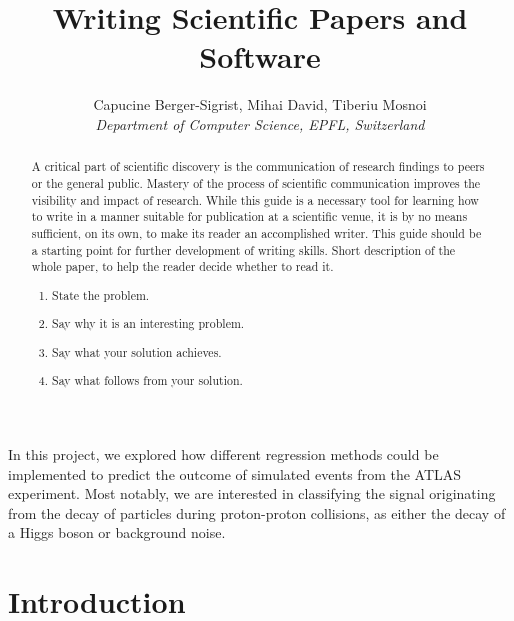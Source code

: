 \documentclass[10pt,conference,compsocconf]{IEEEtran}
\begin{document}
\title{Writing Scientific Papers and Software}

\author{
  Capucine Berger-Sigrist, Mihai David, Tiberiu Mosnoi\\
  \textit{Department of Computer Science, EPFL, Switzerland}
}

\maketitle
\begin{abstract}
A critical part of scientific discovery is the
communication of research findings to peers or the general public.
Mastery of the process of scientific communication improves the
visibility and impact of research. While this guide is a necessary
tool for learning how to write in a manner suitable for publication
at a scientific venue, it is by no means sufficient, on its own, to
make its reader an accomplished writer. 
This guide should be a starting point for further development of 
writing skills.
Short description of the whole paper, to help the
reader decide whether to read it. ~\cite{higgsMLdoc}
\begin{enumerate}
    \item State the problem.
    \item Say why it is an interesting problem.
    \item Say what your solution achieves.
    \item Say what follows from your solution.
\end{enumerate}
\end{abstract}

In this project, we explored how different regression methods could 
be implemented to predict the outcome of simulated events from the ATLAS 
experiment. Most notably, we are interested in classifying the signal 
originating from the decay of particles during proton-proton collisions, 
as either the decay of a Higgs boson or background noise.


\section{Introduction}
\end{document}
